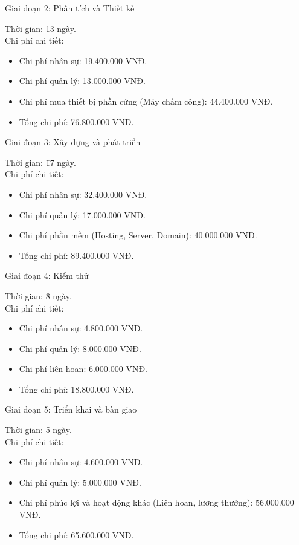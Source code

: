 \noindent Giai đoạn 2: Phân tích và Thiết kế
\begin{tabbing}
    Thời gian: \= 13 ngày. \\
    Chi phí chi tiết: 
\end{tabbing}
\begin{itemize}
    \item Chi phí nhân sự: 19.400.000 VNĐ.
    \item Chi phí quản lý: 13.000.000 VNĐ.
    \item Chi phí mua thiết bị phần cứng (Máy chấm công): 44.400.000 VNĐ.
    \item Tổng chi phí: 76.800.000 VNĐ.
\end{itemize}

\noindent Giai đoạn 3: Xây dựng và phát triển
\begin{tabbing}
    Thời gian: \= 17 ngày. \\
    Chi phí chi tiết: 
\end{tabbing}
\begin{itemize}
    \item Chi phí nhân sự: 32.400.000 VNĐ.
    \item Chi phí quản lý: 17.000.000 VNĐ.
    \item Chi phí phần mềm (Hosting, Server, Domain): 40.000.000 VNĐ.
    \item Tổng chi phí: 89.400.000 VNĐ.
\end{itemize}

\noindent Giai đoạn 4: Kiểm thử
\begin{tabbing}
    Thời gian: \= 8 ngày. \\
    Chi phí chi tiết: 
\end{tabbing}
\begin{itemize}
    \item Chi phí nhân sự: 4.800.000 VNĐ.
    \item Chi phí quản lý: 8.000.000 VNĐ.
    \item Chi phí liên hoan: 6.000.000 VNĐ.
    \item Tổng chi phí: 18.800.000 VNĐ.
\end{itemize}

\noindent Giai đoạn 5: Triển khai và bàn giao
\begin{tabbing}
    Thời gian: \= 5 ngày. \\
    Chi phí chi tiết: 
\end{tabbing}
\begin{itemize}
    \item Chi phí nhân sự: 4.600.000 VNĐ.
    \item Chi phí quản lý: 5.000.000 VNĐ.
    \item Chi phí phúc lợi và hoạt động khác (Liên hoan, lương thưởng): 56.000.000 VNĐ.
    \item Tổng chi phí: 65.600.000 VNĐ.
\end{itemize}

